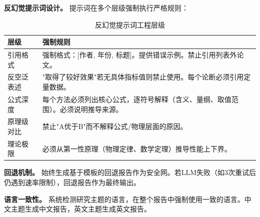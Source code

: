 \textbf{反幻觉提示词设计。}
提示词在多个层级强制执行严格规则：

\begin{table}[htbp]
    \centering
    \caption{反幻觉提示词工程层级}
    \label{tbl:antihallucination}
    \begin{tabular}{lp{7cm}}
    \toprule
    层级 & 强制规则 \\
    \midrule
    引用格式 & 强制格式：[作者, 年份, 标题]。提供错误示例。禁止引用列表外论文。 \\
    反空泛表述 & "取得了较好效果"若无具体指标值则禁止使用。每个论断必须引用定量数据。 \\
    公式深度 & 每个方法必须列出核心公式，逐符号解释（含义、量纲、取值范围）。必须说明推导来源。 \\
    原理级对比 & 禁止"A优于B"而不解释公式/物理层面的原因。 \\
    理论极限 & 必须从第一性原理（物理定律、数学定理）推导性能上下界。 \\
    \bottomrule
    \end{tabular}
\end{table}

\textbf{回退机制。}
始终生成基于模板的回退报告作为安全网。若LLM失败（如3次重试后仍遇到速率限制），回退报告作为最终输出。

\textbf{语言一致性。}
系统检测研究主题的语言，在整个报告中强制使用一致的语言。中文主题生成中文报告，英文主题生成英文报告。
